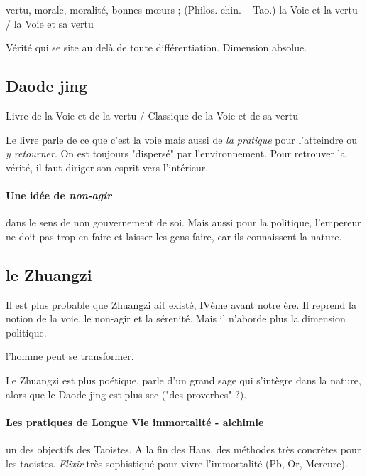 \begin{Def}[daode 道德]
    vertu, morale, moralité, bonnes mœurs ; (Philos. chin. – Tao.) la Voie et la vertu / la Voie et sa vertu
\end{Def}
Vérité qui se site au delà de toute différentiation.  Dimension absolue. 


\subsection{Daode jing}
\begin{Def}
    Livre de la Voie et de la vertu / Classique de la Voie et de sa vertu  
\end{Def}

Le livre parle de ce que c'est la voie mais aussi de \textit{la pratique} pour l'atteindre ou \textit{y retourner}. On est toujours "dispersé" par l'environnement. Pour retrouver la vérité, il faut diriger son esprit vers l'intérieur.

\paragraph{Une idée de \textit{non-agir}}

dans le sens de non gouvernement de soi. Mais aussi pour la politique, l'empereur ne doit pas trop en faire et laisser les gens faire, car ils connaissent la nature.

\subsection{le Zhuangzi}

Il est plus probable que Zhuangzi ait existé, IVème avant notre ère. Il reprend la notion de la voie, le non-agir et la sérenité. Mais il n'aborde plus la dimension politique.

l'homme peut se transformer.

Le Zhuangzi est plus poétique, parle d'un grand sage qui s'intègre dans la nature, alors que le Daode jing est plus sec ("des proverbes" ?).

\paragraph{Les pratiques de Longue Vie immortalité - alchimie} un des objectifs des Taoistes. A la fin des Hans, des méthodes très concrètes pour les taoistes. \textit{Elixir} très sophistiqué pour vivre l'immortalité (Pb, Or, Mercure). 

